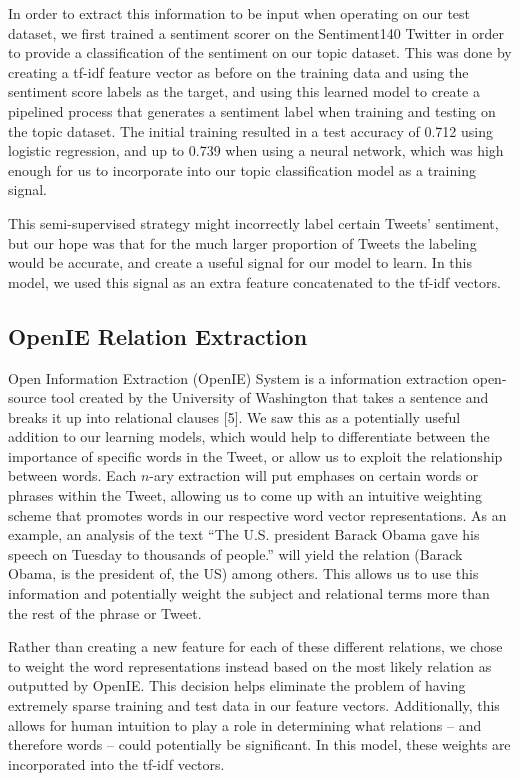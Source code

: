 \documentclass[11pt]{article}
\begin{document}
In order to extract this information to be input when operating on our test dataset, we first trained a sentiment scorer on the Sentiment140 Twitter in order to provide a classification of the sentiment on our topic dataset. This was done by creating a tf-idf feature vector as before on the training data and using the sentiment score labels as the target, and using this learned model to create a pipelined process that generates a sentiment label when training and testing on the topic dataset. The initial training resulted in a test accuracy of 0.712 using logistic regression, and up to 0.739 when using a neural network, which was high enough for us to incorporate into our topic classification model as a training signal.

This semi-supervised strategy might incorrectly label certain Tweets’ sentiment, but our hope was that for the much larger proportion of Tweets the labeling would be accurate, and create a useful signal for our model to learn. In this model, we used this signal as an extra feature concatenated to the tf-idf vectors.

\subsection{OpenIE Relation Extraction}

Open Information Extraction (OpenIE) System is a information extraction open-source tool created by the University of Washington that takes a sentence and breaks it up into relational clauses [5]. We saw this as a potentially useful addition to our learning models, which would help to differentiate between the importance of specific words in the Tweet, or allow us to exploit the relationship between words. Each $n$-ary extraction will put emphases on certain words or phrases within the Tweet, allowing us to come up with an intuitive weighting scheme that promotes words in our respective word vector representations. As an example, an analysis of the text ``The U.S. president Barack Obama gave his speech on Tuesday to thousands of people.” will yield the relation (Barack Obama, is the president of, the US) among others. This allows us to use this information and potentially weight the subject and relational terms more than the rest of the phrase or Tweet.

Rather than creating a new feature for each of these different relations, we chose to weight the word representations instead based on the most likely relation as outputted by OpenIE. This decision helps eliminate the problem of having extremely sparse training and test data in our feature vectors. Additionally, this allows for human intuition to play a role in determining what relations -- and therefore words -- could potentially be significant. In this model, these weights are incorporated into the tf-idf vectors.
\end{document}
